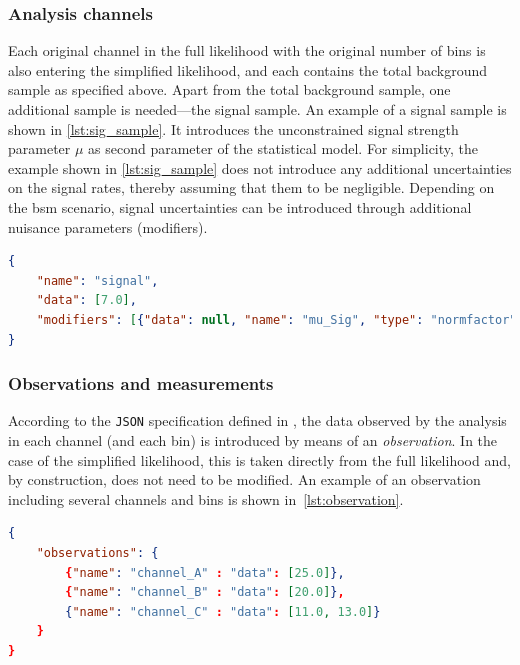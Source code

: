 \subsubsection{Analysis channels}

Each original channel in the full likelihood with the original number of bins is also entering the simplified likelihood, and each contains the total background sample as specified above. Apart from the total background sample, one additional sample is needed---the signal sample. An example of a signal sample is shown in \cref{lst:sig_sample}. It introduces the unconstrained signal strength parameter $\mu$ as second parameter of the statistical model. For simplicity, the example shown in \cref{lst:sig_sample} does not introduce any additional uncertainties on the signal rates, thereby assuming that them to be negligible. Depending on the \gls{bsm} scenario, signal uncertainties can be introduced through additional nuisance parameters (modifiers).

\begin{minipage}{\linewidth}
\begin{lstlisting}[language=json,firstnumber=1,caption={Example of a signal sample with sample rate and unconstrained normalisation parameter.},captionpos=b, label=lst:sig_sample]
{
	"name": "signal",
	"data": [7.0],
	"modifiers": [{"data": null, "name": "mu_Sig", "type": "normfactor"}]
}
\end{lstlisting}
\end{minipage}

\subsubsection{Observations and measurements}

According to the \texttt{JSON} specification defined in \cite{ATL-PHYS-PUB-2019-029}, the data observed by the analysis in each channel (and each bin) is introduced by means of an \textit{observation}. In the case of the simplified likelihood, this is taken directly from the full likelihood and, by construction, does not need to be modified. An example of an observation including several channels and bins is shown in~\cref{lst:observation}.

\begin{minipage}{\linewidth}
\begin{lstlisting}[language=json,firstnumber=1,caption={Example of an observation in the simplified likelihood. It can be directly taken from the corresponding full likelihood. This example implements three channels, two with one bin, and one with three bins.},captionpos=b, label=lst:observation]
{
	"observations": {
		{"name": "channel_A" : "data": [25.0]},
		{"name": "channel_B" : "data": [20.0]},
		{"name": "channel_C" : "data": [11.0, 13.0]}
	}	
}
\end{lstlisting}
\end{minipage}

